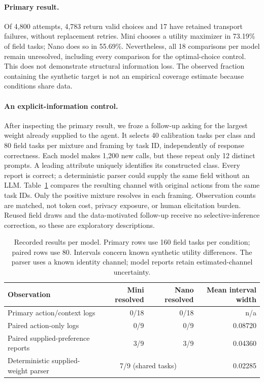 \documentclass[sigconf,review,anonymous]{acmart}
\begin{document}
\paragraph{Primary result.}
Of 4,800 attempts, 4,783 return valid choices and 17 have retained transport failures, without replacement retries. Mini chooses a utility maximizer in 73.19\% of field tasks; Nano does so in 55.69\%. Nevertheless, all 18 comparisons per model remain unresolved, including every comparison for the optimal-choice control. This does not demonstrate structural information loss. The observed fraction containing the synthetic target is not an empirical coverage estimate because conditions share data.

\paragraph{An explicit-information control.}
After inspecting the primary result, we froze a follow-up asking for the largest weight already supplied to the agent. It selects 40 calibration tasks per class and 80 field tasks per mixture and framing by task ID, independently of response correctness. Each model makes 1,200 new calls, but these repeat only 12 distinct prompts. A leading attribute uniquely identifies its constructed class. Every report is correct; a deterministic parser could supply the same field without an LLM. Table~\ref{tab:result} compares the resulting channel with original actions from the same task IDs. Only the positive mixture resolves in each framing. Observation counts are matched, not token cost, privacy exposure, or human elicitation burden. Reused field draws and the data-motivated follow-up receive no selective-inference correction, so these are exploratory descriptions.

\begin{table}[t]
\centering
\caption{Recorded results per model. Primary rows use 160 field tasks per condition; paired rows use 80. Intervals concern known synthetic utility differences. The parser uses a known identity channel; model reports retain estimated-channel uncertainty.}
\label{tab:result}
\begin{tabular}{lrrr}
\toprule Observation & Mini resolved & Nano resolved & Mean interval width \\\midrule
Primary action/context logs & 0/18 & 0/18 & n/a \\
Paired action-only logs & 0/9 & 0/9 & 0.08720 \\
Paired supplied-preference reports & 3/9 & 3/9 & 0.04360 \\
Deterministic supplied-weight parser & \multicolumn{2}{c}{7/9 (shared tasks)} & 0.02285 \\\bottomrule
\end{tabular}
\end{table}
\end{document}

